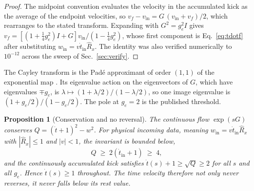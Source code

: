 \documentclass[aps,prd,reprint,nofootinbib]{revtex4-2}
\newtheorem{proposition}{Proposition}
\begin{document}
\begin{proof}
The midpoint convention evaluates the velocity in the accumulated kick
as the average of the endpoint velocities, so
$v_{f} - v_{\mathrm{in}} = G\,(v_{\mathrm{in}} + v_{f})/2$, which
rearranges to the stated transform.  Expanding with
$G^{2} = g_{e}^{2} I$ gives
$v_{f} = \left[(1 + \tfrac{1}{4} g_{e}^{2}) I + G\right]
v_{\mathrm{in}} / (1 - \tfrac{1}{4} g_{e}^{2})$, whose first component
is Eq.~\eqref{eq:tdotf} after substituting
$w_{\mathrm{in}} = v \dot t_{\mathrm{in}} \hat R_{x}$.  The identity was
also verified numerically to $10^{-12}$ across the sweep of
Sec.~\ref{sec:verify}.
\end{proof}

The Cayley transform is the Pad\'e approximant of order $(1,1)$ of the
exponential map \cite{HairerLubichWanner, Iserles2000}.  Its
eigenvalue action on the eigenvectors of $G$, which have eigenvalues
$\mp g_{e}$, is $\lambda \mapsto (1 + \lambda/2)/(1 - \lambda/2)$, so
one image eigenvalue is $(1 + g_{e}/2)/(1 - g_{e}/2)$.  The pole at
$g_{e} = 2$ is the published threshold.

\begin{proposition}[Conservation and no reversal]
\label{prop:conserve}
The continuous flow $\exp(sG)$ conserves
$Q = (\dot t + 1)^{2} - w^{2}$.  For physical incoming data, meaning
$w_{\mathrm{in}} = v \dot t_{\mathrm{in}} \hat R_{x}$ with
$|\hat R_{x}| \leq 1$ and $|v| < 1$, the invariant is bounded below,
\begin{equation}
Q \;\geq\; 2\left(\dot t_{\mathrm{in}} + 1\right) \;\geq\; 4,
\label{eq:Qbound}
\end{equation}
and the continuously accumulated kick satisfies
$\dot t(s) + 1 \geq \sqrt{Q} \geq 2$ for all $s$ and all $g_{e}$.  Hence
$\dot t(s) \geq 1$ throughout.  The time velocity therefore not only
never reverses, it never falls below its rest value.
\end{proposition}
\end{document}
